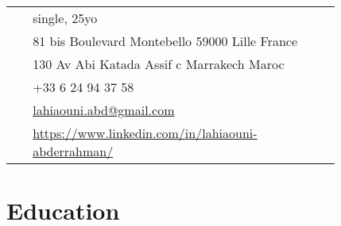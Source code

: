 \documentclass[10pt]{article} %
\begin{document}
\begin{paracol}{2}
\parbox[top][0.12\textheight][c]{\linewidth}{ %
	\vspace{-0.04\textheight} %
	\colorbox{shade}{ %
		\begin{supertabular}{p{0.05\linewidth}|p{0.775\linewidth}} %
			\raisebox{-1pt}{\faUser} & single, 25yo\\ %
			\raisebox{-1pt}{\faHome} & 81 bis Boulevard Montebello 59000 Lille France \\ %
			\raisebox{-1pt}{\faHome} & 130 Av Abi Katada Assif c Marrakech Maroc \\ %
			\raisebox{-1pt}{\faPhone} & +33 6 24 94 37 58 \\ %
			\raisebox{0pt}{\small\faEnvelope} & \href{mailto:lahiaouni.abd@gmail.com}{lahiaouni.abd@gmail.com} \\ %
			\raisebox{-1pt}{\faLinkedinSquare} & \href{https://www.linkedin.com/in/lahiaouni-abderrahman/}{https://www.linkedin.com/in/lahiaouni-abderrahman/} \\ %
		\end{supertabular}
	}
}


\section{Education} 





\begin{supertabular}{rl} %


\end{supertabular}
\end{paracol}
\end{document}
